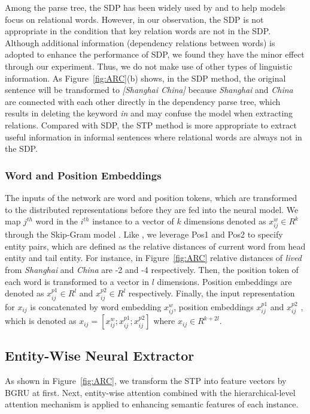 \documentclass[11pt,a4paper]{article}
\begin{document}
  Among the parse tree, the SDP has been widely used by \citet{chen2014fast} and \citet{xu2015classifying} to help models focus on relational words. However, in our observation, the SDP is not appropriate in the condition that key relation words are not in the SDP. Although additional information (dependency relations between words) is adopted to enhance the performance of SDP, we found they have the minor effect through our experiment. Thus, we do not make use of other types of linguistic information. As Figure~\ref{fig:ARC}(b) shows, in the SDP method, the original sentence will be transformed to \emph{[Shanghai China]} because \emph{Shanghai} and \emph{China} are connected with each other directly in the dependency parse tree, which results in deleting the keyword \emph{in} and may confuse the model when extracting relations. Compared with SDP, the STP method is more appropriate to extract useful information in informal sentences where relational words are always not in the SDP.
  
  \subsubsection*{Word and Position Embeddings}
  The inputs of the network are word and position tokens, which are transformed to the distributed representations before they are fed into the neural model. We map $j^{th}$ word in the $i^{th}$ instance to a vector of $k$ dimensions denoted as $x_{ij}^w \in R^k$ through the Skip-Gram model \citep{mikolov2013distributed}. Like \citet{zeng2014relation}, we leverage Pos1 and Pos2 to specify entity pairs, which are defined as the relative distances of current word from head entity and tail entity. For instance, in Figure~\ref{fig:ARC} relative distances of \emph{lived} from \emph{Shanghai} and \emph{China} are -2 and -4 respectively. Then, the position token of each word is transformed to a vector in $l$ dimensions. Position embeddings are denoted as $x_{ij}^{p1} \in R^l$ and $x_{ij}^{p2} \in R^l$ respectively. Finally, the input representation for $x_{ij}$ is concatenated by word embedding $x_{ij}^w$, position embeddings $x_{ij}^{p1}$ and $x_{ij}^{p2}$ , which is denoted as $x_{ij}=[x_{ij}^w;x_{ij}^{p1};x_{ij}^{p2}]$ where $x_{ij} \in R^{k+2l}$.

  \subsection{Entity-Wise Neural Extractor}
  As shown in Figure~\ref{fig:ARC}, we transform the STP into feature vectors by BGRU at first. Next, entity-wise attention combined with the hierarchical-level attention mechanism is applied to enhancing semantic features of each instance.
\end{document}
